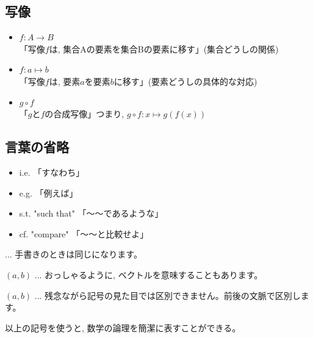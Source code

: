 \subsection*{写像}
\begin{itemize}
\item $f: A \rightarrow B$\\「写像$f$は, 集合Aの要素を集合Bの要素に移す」(集合どうしの関係)
\item $f: a \mapsto b$\\「写像$f$は, 要素$a$を要素$b$に移す」(要素どうしの具体的な対応)
\item $g \circ f$\\「$g$と$f$の合成写像」つまり, $g\circ f: x \mapsto g(f(x))$
\end{itemize}

\subsection*{言葉の省略}
\begin{itemize}
\item i.e. 「すなわち」
\item e.g. 「例えば」
\item s.t. "such that" 「〜〜であるような」
\item cf. "compare" 「〜〜と比較せよ」
\end{itemize}

\begin{faq}{\small{}
... 手書きのときは同じになります。}\end{faq}
\mv

\begin{faq}{\small$(a, b)$
... おっしゃるように, ベクトルを意味することもあります。}\end{faq}
\mv

\begin{faq}{\small$(a, b)$
... 残念ながら記号の見た目では区別できません。前後の文脈で区別します。}\end{faq}
\mv

以上の記号を使うと, 数学の論理を簡潔に表すことができる。

